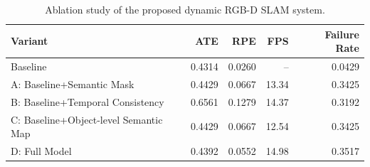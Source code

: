 \begin{table}[t]
\centering
\caption{Ablation study of the proposed dynamic RGB-D SLAM system.}
\label{tab:ablation_final}
\begin{tabular}{lrrrr}
\toprule
Variant & ATE & RPE & FPS & Failure Rate \\
\midrule
Baseline & 0.4314 & 0.0260 & -- & 0.0429 \\
A: Baseline+Semantic Mask & 0.4429 & 0.0667 & 13.34 & 0.3425 \\
B: Baseline+Temporal Consistency & 0.6561 & 0.1279 & 14.37 & 0.3192 \\
C: Baseline+Object-level Semantic Map & 0.4429 & 0.0667 & 12.54 & 0.3425 \\
D: Full Model & 0.4392 & 0.0552 & 14.98 & 0.3517 \\
\bottomrule
\end{tabular}
\end{table}
